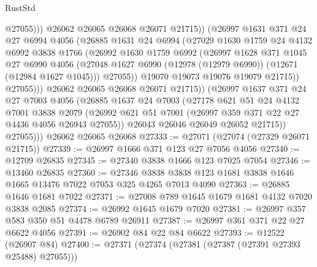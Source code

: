 \begin{lexlean}{RustStd}
\begin{coremodule}
                          @27055)))
                    @26062
                    @26065
                    @26068
                    @26071
                    @21715))
                (@26997
                  @1631
                  @371
                  @24
                  @27
                  @6994
                  @4056
                  (@26885
                    @1631
                    @24
                    @6994
                    (@27029
                      @1630
                      @1759
                      @24
                      @4132
                      @6992
                      @3838
                      @1766
                      (@26992
                        @1630
                        @1759
                        @6992
                        (@26997
                          @1628
                          @371
                          @1045
                          @27
                          @6990
                          @4056
                          (@27048 @1627 @6990 (@12978 (@12979 @6990)) (@12671 (@12984 @1627 @1045)))
                          @27055))
                      @19070
                      @19073
                      @19076
                      @19079
                      @21715))
                  @27055)))
            @26062
            @26065
            @26068
            @26071
            @21715))
        (@26997
          @1637
          @371
          @24
          @27
          @7003
          @4056
          (@26885
            @1637
            @24
            @7003
            (@27178
              @621
              @51
              @24
              @4132
              @7001
              @3838
              @2079
              (@26992 @621 @51 @7001 (@26997 @359 @371 @22 @27 @4436 @4056 @26943 @27055))
              @26043
              @26046
              @26049
              @26052
              @21715))
          @27055)))
    @26062
    @26065
    @26068
@27333 := @27071 (@27074 (@27329 @26071 @21715))
@27339 := @26997 @1666 @371 @123 @27 @7056 @4056
@27340 := @12709 @26835
@27345 := @27340 @3838 @1666 @123 @7025 @7054
@27346 := @13460 @26835
@27360 := @27346 @3838 @3838 @123 @1681 @3838 @1646 @1665 @13476 @7022 @7053 @325 @4265 @7013 @4090
@27363 := @26885 @1646 @1681 @7022
@27371 := @27008 @789 @1645 @1679 @1681 @4132 @7020 @3838 @2085
@27374 := @26992 @1645 @1679 @7020
@27381 := @26997 @357 @583 @350 @51 @4478 @6789 @26911
@27387 := @26997 @361 @371 @22 @27 @6622 @4056
@27391 := @26902 @84 @22 @84 @6622
@27393 := @12522 (@26907 @84)
@27400 := @27371 (@27374 (@27381 (@27387 (@27391 @27393 @25488) @27055)))

\end{coremodule}
\end{lexlean}
